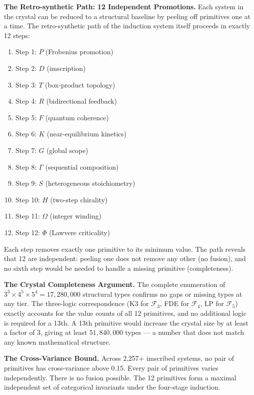\documentclass[12pt,a4paper]{article}
\begin{document}
\textbf{The Retro-synthetic Path: 12 Independent Promotions.}
Each system in the crystal can be reduced to a structural baseline by peeling off primitives one at a time. The retro-synthetic path of the induction system itself proceeds in exactly 12 steps:
\begin{enumerate}
    \item Step 1: $P$ (Frobenius promotion)
    \item Step 2: $D$ (imscription)
    \item Step 3: $T$ (box-product topology)
    \item Step 4: $R$ (bidirectional feedback)
    \item Step 5: $F$ (quantum coherence)
    \item Step 6: $K$ (near-equilibrium kinetics)
    \item Step 7: $G$ (global scope)
    \item Step 8: $\Gamma$ (sequential composition)
    \item Step 9: $S$ (heterogeneous stoichiometry)
    \item Step 10: $H$ (two-step chirality)
    \item Step 11: $\Omega$ (integer winding)
    \item Step 12: $\Phi$ (Lawvere criticality)
\end{enumerate}
Each step removes exactly one primitive to its minimum value. The path reveals that 12 are independent: peeling one does not remove any other (no fusion), and no sixth step would be needed to handle a missing primitive (completeness).

\textbf{The Crystal Completeness Argument.}
The complete enumeration of $3^3 \times 4^5 \times 5^4 = 17,280,000$ structural types confirms no gaps or missing types at any tier. The three-logic correspondence (K3 for $\mathcal{F}_3$, FDE for $\mathcal{F}_4$, LP for $\mathcal{F}_5$) exactly accounts for the value counts of all 12 primitives, and no additional logic is required for a 13th. A 13th primitive would increase the crystal size by at least a factor of 3, giving at least $51,840,000$ types --- a number that does not match any known mathematical structure.

\textbf{The Cross-Variance Bound.}
Across 2,257+ imscribed systems, no pair of primitives has cross-variance above 0.15. Every pair of primitives varies independently. There is no fusion possible. The 12 primitives form a maximal independent set of categorical invariants under the four-stage induction.
\end{document}
